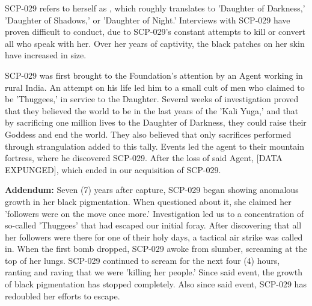 SCP-029 refers to herself as , which roughly translates to 'Daughter of Darkness,' 'Daughter of Shadows,' or 'Daughter of Night.' Interviews with SCP-029 have proven difficult to conduct, due to SCP-029's constant attempts to kill or convert all who speak with her. Over her years of captivity, the black patches on her skin have increased in size.

SCP-029 was first brought to the Foundation's attention by an Agent working in rural India. An attempt on his life led him to a small cult of men who claimed to be 'Thuggees,' in service to the Daughter. Several weeks of investigation proved that they believed the world to be in the last years of the 'Kali Yuga,' and that by sacrificing one million lives to the Daughter of Darkness, they could raise their Goddess and end the world. They also believed that only sacrifices performed through strangulation added to this tally. Events led the agent to their mountain fortress, where he discovered SCP-029. After the loss of said Agent, [DATA EXPUNGED], which ended in our acquisition of SCP-029.

\textbf{Addendum:} Seven (7) years after capture, SCP-029 began showing anomalous growth in her black pigmentation. When questioned about it, she claimed her 'followers were on the move once more.' Investigation led us to a concentration of so-called 'Thuggees' that had escaped our initial foray. After discovering that all her followers were there for one of their holy days, a tactical air strike was called in. When the first bomb dropped, SCP-029 awoke from slumber, screaming at the top of her lungs. SCP-029 continued to scream for the next four (4) hours, ranting and raving that we were 'killing her people.' Since said event, the growth of black pigmentation has stopped completely. Also since said event, SCP-029 has redoubled her efforts to escape.